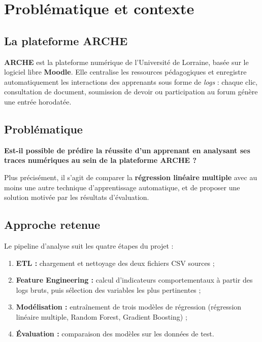 \documentclass[12pt, a4paper, french]{report}
\begin{document}
\tableofcontents
\clearpage

\chapter{Problématique et contexte}

\section{La plateforme ARCHE}

\textbf{ARCHE} est la plateforme numérique de l'Université de Lorraine, basée sur le logiciel libre \textbf{Moodle}.
Elle centralise les ressources pédagogiques et enregistre automatiquement les interactions des apprenants sous forme de \textit{logs} : chaque clic, consultation de document, soumission de devoir ou participation au forum génère une entrée horodatée.

\section{Problématique}

\begin{tcolorbox}[colback=pythonyellow!15, colframe=pythonyellow!80!pythondark, arc=4pt]
  \centering
  \Large\bfseries
  Est-il possible de prédire la réussite d'un apprenant en analysant ses traces numériques au sein de la plateforme ARCHE ?
\end{tcolorbox}

\vspace{0.5cm}

Plus précisément, il s'agit de comparer la \textbf{régression linéaire multiple} avec au moins une autre technique d'apprentissage automatique, et de proposer une solution motivée par les résultats d'évaluation.

\section{Approche retenue}

\noindent Le pipeline d'analyse suit les quatre étapes du projet :

\begin{enumerate}
  \item \textbf{ETL :} chargement et nettoyage des deux fichiers CSV sources ;
  \item \textbf{Feature Engineering :} calcul d'indicateurs comportementaux à partir des logs bruts, puis sélection des variables les plus pertinentes ;
  \item \textbf{Modélisation :} entraînement de trois modèles de régression (régression linéaire multiple, Random Forest, Gradient Boosting) ;
  \item \textbf{Évaluation :} comparaison des modèles sur les données de test.
\end{enumerate}
\end{document}
